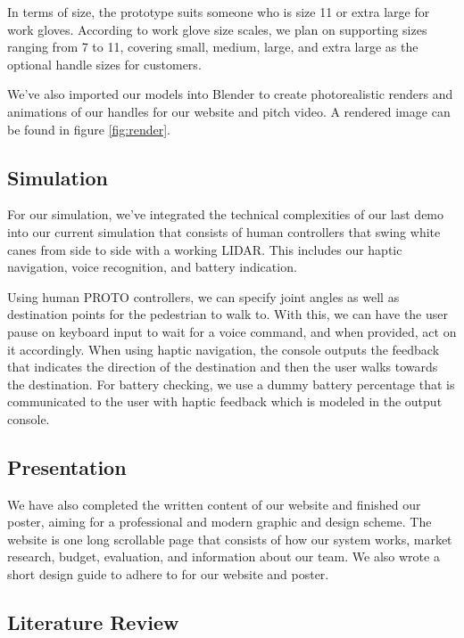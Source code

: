 \documentclass{article}
\begin{document}
In terms of size, the prototype suits someone who is size 11 or extra large for work gloves. According to work glove size scales, we plan on supporting sizes ranging from 7 to 11, covering small, medium, large, and extra large as the optional handle sizes for customers. \cite{3glove}

We've also imported our models into Blender to create photorealistic renders and animations of our handles for our website and pitch video. A rendered image can be found in figure \ref{fig:render}.

\subsection{Simulation}

For our simulation, we've integrated the technical complexities of our last demo into our current simulation that consists of human controllers that swing white canes from side to side with a working LIDAR. This includes our haptic navigation, voice recognition, and battery indication.

Using human PROTO controllers, we can specify joint angles as well as destination points for the pedestrian to walk to. With this, we can have the user pause on keyboard input to wait for a voice command, and when provided, act on it accordingly. When using haptic navigation, the console outputs the feedback that indicates the direction of the destination and then the user walks towards the destination. For battery checking, we use a dummy battery percentage that is communicated to the user with haptic feedback which is modeled in the output console.

\subsection{Presentation}

We have also completed the written content of our website and finished our poster, aiming for a professional and modern graphic and design scheme. The website is one long scrollable page that consists of how our system works, market research, budget, evaluation, and information about our team. We also wrote a short design guide to adhere to for our website and poster.

\subsection{Literature Review}
 
\end{document}
